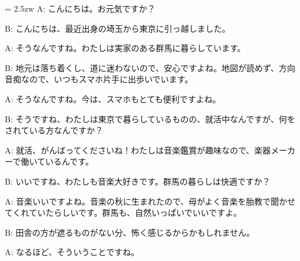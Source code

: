 \documentclass[11pt]{amsart}
\title{}
\author{}
\newenvironment{hangall}[1]{\hangindent = 2.5zw\everypar{\hangindent = 2.5zw}}{}
\begin{document}
\maketitle
\begin{hangall}{}%
A: こんにちは。お元気ですか？



B: こんにちは、最近出身の埼玉から東京に引っ越しました。



A: そうなんですね。わたしは実家のある群馬に暮らしています。



B: 地元は落ち着くし、道に迷わないので、安心ですよね。地図が読めず、方向音痴なので、いつもスマホ片手に出歩いでいます。



A: そうなんですね。今は、スマホもとても便利ですよね。



B: そうですね、わたしは東京で暮らしているものの、就活中なんですが、何をされている方なんですか？



A: 就活、がんばってくださいね！わたしは音楽鑑賞が趣味なので、楽器メーカーで働いているんです。



B: いいですね、わたしも音楽大好きです。群馬の暮らしは快適ですか？



A: 音楽いいですよね。音楽の秋に生まれたので、母がよく音楽を胎教で聞かせてくれていたらしいです。群馬も、自然いっぱいでいいですよ。



B: 田舎の方が遮るものがない分、怖く感じるからかもしれません。



A: なるほど、そういうことですね。\end{hangall}
\end{document}
